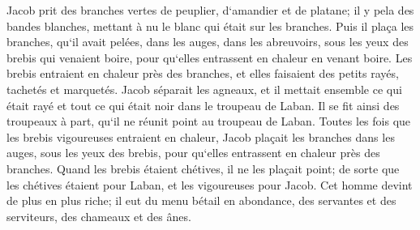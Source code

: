 \verse Jacob prit des branches vertes de peuplier, d`amandier et de platane; il y pela des bandes blanches, mettant à nu le blanc qui était sur les branches. 
\verse Puis il plaça les branches, qu`il avait pelées, dans les auges, dans les abreuvoirs, sous les yeux des brebis qui venaient boire, pour qu`elles entrassent en chaleur en venant boire. 
\verse Les brebis entraient en chaleur près des branches, et elles faisaient des petits rayés, tachetés et marquetés. 
\verse Jacob séparait les agneaux, et il mettait ensemble ce qui était rayé et tout ce qui était noir dans le troupeau de Laban. Il se fit ainsi des troupeaux à part, qu`il ne réunit point au troupeau de Laban. 
\verse Toutes les fois que les brebis vigoureuses entraient en chaleur, Jacob plaçait les branches dans les auges, sous les yeux des brebis, pour qu`elles entrassent en chaleur près des branches. 
\verse Quand les brebis étaient chétives, il ne les plaçait point; de sorte que les chétives étaient pour Laban, et les vigoureuses pour Jacob. 
\verse Cet homme devint de plus en plus riche; il eut du menu bétail en abondance, des servantes et des serviteurs, des chameaux et des ânes. 

\chapter{}

